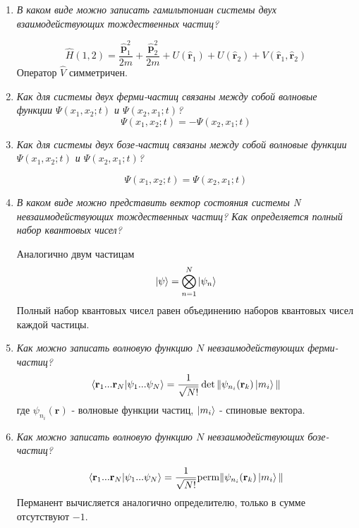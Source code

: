 \documentclass{article}
\begin{document}
\begin{enumerate}
	\item \textit{В каком виде можно записать гамильтониан системы двух взаимодействующих тождественных частиц?}
	
	\begin{equation}
		\hat{H}(1,2) = \frac{\hat{\textbf{p}}_1^2}{2m} + \frac{\hat{\textbf{p}}_2^2}{2m} + U(\hat{\textbf{r}}_1) + U(\hat{\textbf{r}}_2) + V(\hat{\textbf{r}}_1, \hat{\textbf{r}}_2)
	\end{equation}
	Оператор $\hat{V}$ симметричен.
	
	\item \textit{Как для системы двух ферми-частиц связаны между собой волновые функции $\Psi(x_1, x_2;t)$ и $\Psi(x_2, x_1;t)$?}
	\begin{equation}
		\Psi(x_1, x_2;t) = -\Psi(x_2, x_1;t)
	\end{equation}
	
	\item \textit{Как для системы двух бозе-частиц связаны между собой волновые функции $\Psi(x_1, x_2;t)$ и $\Psi(x_2, x_1;t)$?}
	
	\begin{equation}
		\Psi(x_1, x_2;t) = \Psi(x_2, x_1;t)
	\end{equation}
	
	\item \textit{В каком виде можно представить вектор состояния системы N невзаимодействующих тождественных частиц? Как определяется полный набор квантовых чисел?}
	
	Аналогично двум частицам	
	\begin{equation}
		\ket{\psi} = \bigotimes\limits_{n=1}^N \ket{\psi_n}
	\end{equation}
	Полный набор квантовых чисел равен объединению наборов квантовых чисел каждой частицы.
	
	\item \textit{Как можно записать волновую функцию $N$ невзаимодействующих ферми-частиц?}
	\begin{equation}
		\braket{\textbf{r}_1...\textbf{r}_N|\psi_1 ... \psi_N} = \frac{1}{\sqrt{N!}}\det \|\psi_{n_i}(\textbf{r}_k) \ket{m_i} \|
	\end{equation}
	где $\psi_{n_i}(\textbf{r})$ - волновые функции частиц, $\ket{m_i}$ - спиновые вектора.
	
	\item \textit{Как можно записать волновую функцию $N$ невзаимодействующих бозе-частиц?}
	
	\begin{equation}
		\braket{\textbf{r}_1...\textbf{r}_N|\psi_1 ... \psi_N} = \frac{1}{\sqrt{N!}}\text{perm} \|\psi_{n_i}(\textbf{r}_k) \ket{m_i} \|
	\end{equation}
	Перманент вычисляется аналогично определителю, только в сумме отсутствуют $-1$.
	

\end{enumerate}
\end{document}
